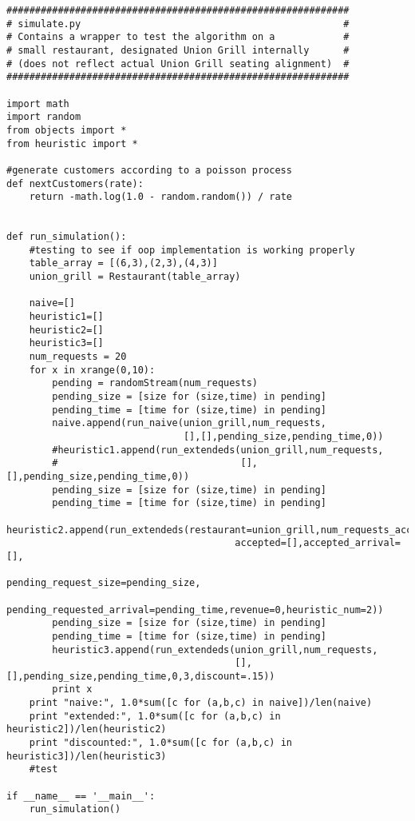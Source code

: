 \documentclass[12pt, titlepage]{article}
\begin{document}
\begin{Verbatim}[fontsize=\scriptsize]
############################################################
# simulate.py                                              #
# Contains a wrapper to test the algorithm on a            #
# small restaurant, designated Union Grill internally      #
# (does not reflect actual Union Grill seating alignment)  #
############################################################

import math
import random
from objects import *
from heuristic import *

#generate customers according to a poisson process
def nextCustomers(rate):
    return -math.log(1.0 - random.random()) / rate


def run_simulation():
    #testing to see if oop implementation is working properly
    table_array = [(6,3),(2,3),(4,3)]
    union_grill = Restaurant(table_array)
    
    naive=[]
    heuristic1=[]
    heuristic2=[]
    heuristic3=[]
    num_requests = 20
    for x in xrange(0,10):
        pending = randomStream(num_requests)
        pending_size = [size for (size,time) in pending]
        pending_time = [time for (size,time) in pending]
        naive.append(run_naive(union_grill,num_requests,
                               [],[],pending_size,pending_time,0))
        #heuristic1.append(run_extendeds(union_grill,num_requests,
        #                                [],[],pending_size,pending_time,0))
        pending_size = [size for (size,time) in pending]
        pending_time = [time for (size,time) in pending]
        heuristic2.append(run_extendeds(restaurant=union_grill,num_requests_accepted=num_requests,
                                        accepted=[],accepted_arrival=[],
                                        pending_request_size=pending_size,
                                        pending_requested_arrival=pending_time,revenue=0,heuristic_num=2))
        pending_size = [size for (size,time) in pending]
        pending_time = [time for (size,time) in pending]
        heuristic3.append(run_extendeds(union_grill,num_requests,
                                        [],[],pending_size,pending_time,0,3,discount=.15))
        print x
    print "naive:", 1.0*sum([c for (a,b,c) in naive])/len(naive)
    print "extended:", 1.0*sum([c for (a,b,c) in heuristic2])/len(heuristic2)
    print "discounted:", 1.0*sum([c for (a,b,c) in heuristic3])/len(heuristic3)
    #test

if __name__ == '__main__':
    run_simulation()
\end{Verbatim}
\end{document}
